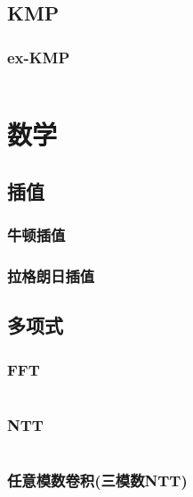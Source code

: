 \documentclass[a4paper]{article}
\begin{document}
\begin{multicols}{2}
			\subsection{KMP}
				

				\subsubsection{ex-KMP}
					\inputminted{cpp}{../src/string/exKMP.cpp}
			




		\section{数学}

			\subsection{插值}
				\subsubsection{牛顿插值}


				\subsubsection{拉格朗日插值}

			
			\subsection{多项式}
				\subsubsection{FFT}
					\inputminted{cpp}{../src/math/FFT.cpp}

				\subsubsection{NTT}
					\inputminted{cpp}{../src/math/NTT.cpp}

				\subsubsection{任意模数卷积(三模数NTT)}
					\inputminted{cpp}{../src/math/任意模数卷积.cpp}


\end{multicols}
\end{document}
